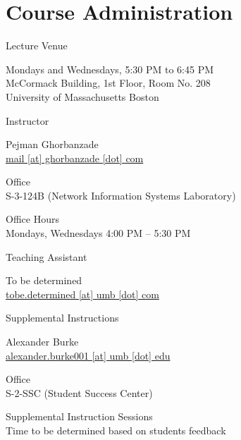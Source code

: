 \documentclass[compress]{beamer}
\begin{document}
\prepareCover

\section{Course Administration}

\begin{slide}
	\begin{block}{Lecture Venue}

	Mondays and Wednesdays, 5:30 PM to 6:45 PM\\
	McCormack Building, 1st Floor, Room No. 208\\
	University of Massachusetts Boston

	\end{block}
\end{slide}

\begin{slide}
	\begin{block}{Instructor}

	Pejman Ghorbanzade\\
	\href{mailto:mail@ghorbanzade.com}{mail [at] ghorbanzade [dot] com}

	\par
	\vspace{0.5em}
	{\large Office}\\S-3-124B (Network Information Systems Laboratory)

	\par
	\vspace{0.5em}
	{\large Office Hours}\\Mondays, Wednesdays 4:00 PM -- 5:30 PM

	\end{block}
\end{slide}

\begin{slide}
	\begin{block}{Teaching Assistant}

	To be determined\\
	\href{mailto:tobe.determined@umb.edu}{tobe.determined [at] umb [dot] com}

	\end{block}
\end{slide}

\begin{slide}
	\begin{block}{Supplemental Instructions}
		
	Alexander Burke\\
	\href{mailto:alexander.burke001@umb.edu}{alexander.burke001 [at] umb [dot] edu}

	\par
	\vspace{0.5em}
	{\large Office}\\
	S-2-SSC (Student Success Center)

	\par
	\vspace{0.5em}
	{\large Supplemental Instruction Sessions}\\
	Time to be determined based on students feedback

	\end{block}
\end{slide}
\end{document}
